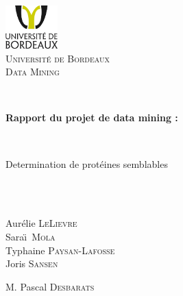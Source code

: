 %

\begin{titlepage}

\begin{center}


\includegraphics[width=0.15\textwidth]{logounibdx.png}\\[1cm]

\textsc{\LARGE Université de Bordeaux}\\[1.5cm]
\vspace*{0.5cm}
\textsc{\Large Data Mining}\\[0.5cm]

\vspace*{1cm}

\HRule \\[0.3cm]
{ \begin{Huge}
\bfseries Rapport du projet de data mining :
\end{Huge} \\ \begin{huge}
Determination de protéines semblables
\end{huge}}\\[0.3cm]

\HRule \\[1.3cm]
\begin{minipage}{0.4\textwidth}
\begin{center} \large
Aurélie \textsc{LeLievre}\\
Sara\"\i ~\textsc{Mola}\\
Typhaine \textsc{Paysan-Lafosse}\\
Joris \textsc{Sansen}\\
\end{center}
\end{minipage}
\begin{minipage}{0.4\textwidth}
\begin{flushright} \large
M. Pascal \textsc{Desbarats}
\end{flushright}
\end{minipage}


\end{center}
\end{titlepage}
